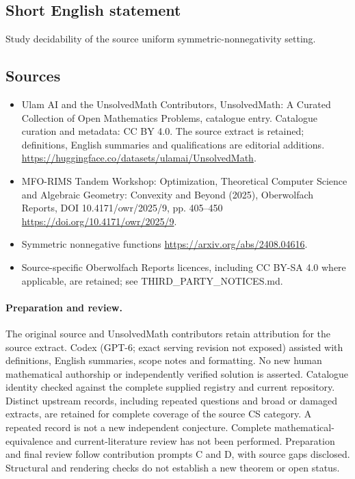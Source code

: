 \documentclass[11pt]{article}
\begin{document}
\subsection{Short English statement}
Study decidability of the source uniform symmetric-nonnegativity setting.
\subsection{Sources}
\begin{itemize}
\item[\hypertarget{source:statement:1}{S1}] Ulam AI and the UnsolvedMath Contributors, UnsolvedMath: A Curated Collection of Open Mathematics Problems, catalogue entry. Catalogue curation and metadata: CC BY 4.0. The source extract is retained; definitions, English summaries and qualifications are editorial additions.
\url{https://huggingface.co/datasets/ulamai/UnsolvedMath}.
\item[\hypertarget{source:statement:2}{S2}] MFO-RIMS Tandem Workshop: Optimization, Theoretical Computer Science and Algebraic Geometry: Convexity and Beyond (2025), Oberwolfach Reports, DOI 10.4171/owr/2025/9, pp. 405--450
\url{https://doi.org/10.4171/owr/2025/9}.
\item[\hypertarget{source:statement:3}{S3}] Symmetric nonnegative functions
\url{https://arxiv.org/abs/2408.04616}.
\item Source-specific Oberwolfach Reports licences, including CC BY-SA 4.0 where applicable, are retained; see THIRD\_PARTY\_NOTICES.md.
\end{itemize}
\paragraph{Preparation and review.}
The original source and UnsolvedMath contributors retain attribution for the source extract. Codex (GPT-6; exact serving revision not exposed) assisted with definitions, English summaries, scope notes and formatting. No new human mathematical authorship or independently verified solution is asserted. Catalogue identity checked against the complete supplied registry and current repository. Distinct upstream records, including repeated questions and broad or damaged extracts, are retained for complete coverage of the source CS category. A repeated record is not a new independent conjecture. Complete mathematical-equivalence and current-literature review has not been performed. Preparation and final review follow contribution prompts C and D, with source gaps disclosed. Structural and rendering checks do not establish a new theorem or open status.
\label{end:statement}
\end{document}
